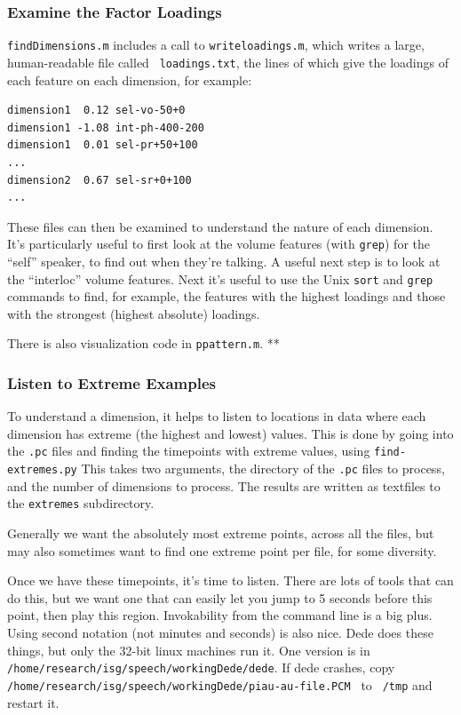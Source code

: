 \documentclass[11pt]{article}
\begin{document}
\subsubsection{Examine the Factor Loadings}

{\tt findDimensions.m} includes a call to {\tt writeloadings.m}, which
writes a large, human-readable file called {\tt
  loadings.txt}, the lines of which give the loadings of each feature on each
dimension, for example:

\begin{verbatim}
dimension1  0.12 sel-vo-50+0
dimension1 -1.08 int-ph-400-200
dimension1  0.01 sel-pr+50+100
...
dimension2  0.67 sel-sr+0+100  
...
\end{verbatim}

These files can then be examined to understand the nature of each
dimension.  It's particularly useful to first look at the volume features (with
{\tt grep}) for the ``self'' speaker, to find out when they're
talking.  A useful next step is to look at the ``interloc'' volume
features.  Next it's useful to use the Unix {\tt sort} and {\tt grep}
commands to find, for example, the features with the highest loadings
and those with the strongest (highest absolute) loadings.  

There is also visualization code in  {\tt ppattern.m}.  **


\subsubsection{Listen to Extreme Examples}

To understand a dimension, it helps to listen to locations in data
where each dimension has extreme (the highest and lowest) values.
This is done by going into the {\tt .pc} files and finding the
timepoints with extreme values, using {\tt find-extremes.py} This
takes two arguments, the directory of the {\tt .pc} files to process,
and the number of dimensions to process.  The results are written as
textfiles to the {\tt extremes} subdirectory. 

Generally we want the absolutely most extreme points, across all the
files, but may also sometimes want to find one extreme point per file,
for some diversity.

Once we have these timepoints, it's time to listen.  There are lots of
tools that can do this, but we want one that can easily let you jump
to 5 seconds before this point, then play this region.  Invokability
from the command line is a big plus.  Using second notation (not
minutes and seconds) is also nice.  Dede does these things, but only
the 32-bit linux machines run it. One version is in {\tt
  /home/research/isg/speech/workingDede/dede}.  If dede crashes, copy
{\tt /home/research/isg/speech/workingDede/piau-au-file.PCM } to {\tt
  /tmp} and restart it.
\end{document}
